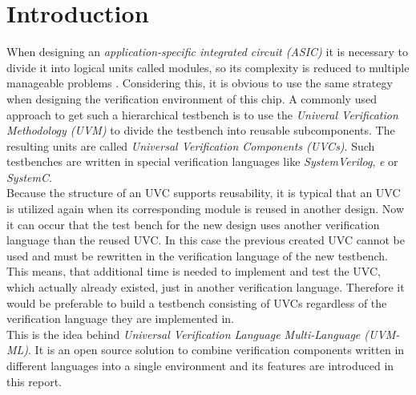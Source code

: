 \section{Introduction}\label{introduction}
When designing an \emph{application-specific integrated circuit (ASIC)} it is
necessary to divide it into logical units called modules, so its complexity is
reduced to multiple manageable problems \cite{verilog}. Considering this, it is obvious to use the same
strategy when designing the verification environment of this chip. A commonly
used approach to get such a hierarchical testbench is to use the \emph{Univeral
Verification Methodology (UVM)} to divide the testbench into reusable
subcomponents. The resulting units are called \emph{Universal Verification
Components (UVCs)}. Such testbenches are written in special verification
languages like \emph{SystemVerilog}, \emph{e} or \emph{SystemC}.\\
Because the structure of an UVC supports reusability, it is typical that an UVC
is utilized again when its corresponding module is reused in another design. Now
it can occur that the test bench for the new design uses another verification
language than the reused UVC. In this case the previous created UVC cannot be
used and must be rewritten in the verification language of the new testbench.
This means, that additional time is needed to implement and test the UVC, which
actually already existed, just in another verification language. Therefore it
would be preferable to build a testbench consisting of UVCs regardless of the
verification language they are implemented in.\\
This is the idea behind  \emph{Universal Verification Language
Multi-Language (UVM-ML)}. It is an open source solution to combine
verification components written in different languages into a single
environment and its features are introduced in this report.



